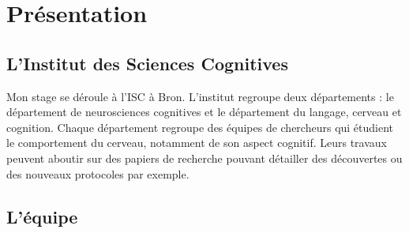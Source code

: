 \section{Présentation}

\subsection{L'Institut des Sciences Cognitives}

Mon stage se déroule à l'\gls{ISC} à Bron. L'institut regroupe deux départements : le département de neurosciences cognitives et le département du langage, cerveau et cognition.
Chaque département regroupe des équipes de chercheurs qui étudient le comportement du cerveau, notamment de son aspect cognitif. Leurs travaux peuvent aboutir sur des papiers de
recherche pouvant détailler des découvertes ou des nouveaux protocoles par exemple.

\subsection{L'équipe}

\newpage